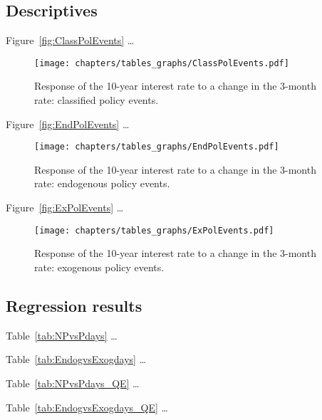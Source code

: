 
\subsection{Descriptives}

Figure~\vref{fig:ClassPolEvents} \dots
\begin{figure}[htbp]
	\centering
		\texttt{[image: chapters/tables\_graphs/ClassPolEvents.pdf]} 
	\caption{Response of the 10-year interest rate to a change in the 3-month rate: classified policy events.}
\label{fig:ClassPolEvents}
\end{figure}
%

Figure~\vref{fig:EndPolEvents} \dots
\begin{figure}[htbp]
	\centering
	\texttt{[image: chapters/tables\_graphs/EndPolEvents.pdf]} 
	\caption{Response of the 10-year interest rate to a change in the 3-month rate: endogenous policy events.}
	\label{fig:EndPolEvents}
\end{figure}
%

Figure~\vref{fig:ExPolEvents} \dots
\begin{figure}[htbp]
	\centering
	\texttt{[image: chapters/tables\_graphs/ExPolEvents.pdf]} 
	\caption{Response of the 10-year interest rate to a change in the 3-month rate: exogenous policy events.}
	\label{fig:ExPolEvents}
\end{figure}
%

\subsection{Regression results}

Table~\vref{tab:NPvsPdays} \dots 

%

Table~\vref{tab:EndogvsExogdays} \dots 

%

Table~\vref{tab:NPvsPdays_QE} \dots 

%

Table~\vref{tab:EndogvsExogdays_QE} \dots 

%


